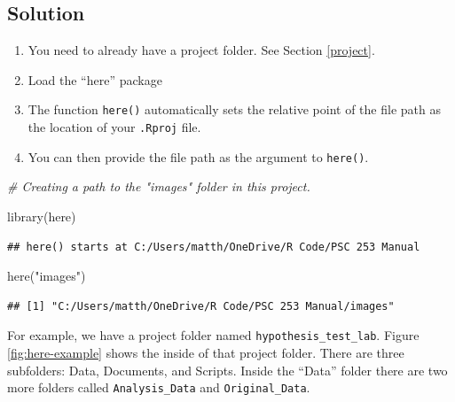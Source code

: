 \documentclass[
]{book}
\newenvironment{Shaded}{\begin{snugshade}}{\end{snugshade}}
\newcommand{\CommentTok}[1]{\textcolor[rgb]{0.56,0.35,0.01}{\textit{#1}}}
\newcommand{\FunctionTok}[1]{\textcolor[rgb]{0.00,0.00,0.00}{#1}}
\newcommand{\NormalTok}[1]{#1}
\newcommand{\StringTok}[1]{\textcolor[rgb]{0.31,0.60,0.02}{#1}}
\providecommand{\tightlist}{%
  \setlength{\itemsep}{0pt}\setlength{\parskip}{0pt}}
\begin{document}
\hypertarget{solution-8}{%
\subsection{Solution}\label{solution-8}}

\begin{enumerate}
\def\labelenumi{\arabic{enumi}.}
\tightlist
\item
  You need to already have a project folder. See Section \ref{project}.
\item
  Load the ``here'' package
\item
  The function \texttt{here()} automatically sets the relative point of the file path as the location of your \texttt{.Rproj} file.
\item
  You can then provide the file path as the argument to \texttt{here()}.
\end{enumerate}

\begin{Shaded}
\begin{Highlighting}[]
\CommentTok{\# Creating a path to the "images" folder in this project.}

\FunctionTok{library}\NormalTok{(here)}
\end{Highlighting}
\end{Shaded}

\begin{verbatim}
## here() starts at C:/Users/matth/OneDrive/R Code/PSC 253 Manual
\end{verbatim}

\begin{Shaded}
\begin{Highlighting}[]
\FunctionTok{here}\NormalTok{(}\StringTok{"images"}\NormalTok{)}
\end{Highlighting}
\end{Shaded}

\begin{verbatim}
## [1] "C:/Users/matth/OneDrive/R Code/PSC 253 Manual/images"
\end{verbatim}

For example, we have a project folder named \texttt{hypothesis\_test\_lab}. Figure \ref{fig:here-example} shows the inside of that project folder. There are three subfolders: Data, Documents, and Scripts. Inside the ``Data'' folder there are two more folders called \texttt{Analysis\_Data} and \texttt{Original\_Data}.
\end{document}
